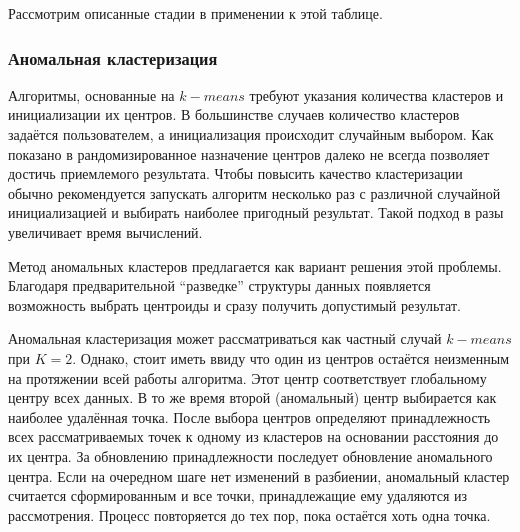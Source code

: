 \documentclass[12pt,twoside,a4paper,tikz,border=5]{refart}
\begin{document}
			Рассмотрим описанные стадии в применении к этой таблице.

			\subsubsection{Аномальная кластеризация}
		 		Алгоритмы, основанные на $ k-means $ требуют указания количества кластеров и инициализации их центров. В большинстве случаев количество кластеров задаётся пользователем, а инициализация происходит случайным выбором. Как показано в \cite{mirkin-ds} рандомизированное назначение центров далеко не всегда позволяет достичь приемлемого результата. Чтобы повысить качество кластеризации обычно рекомендуется запускать алгоритм несколько раз с различной случайной инициализацией и выбирать наиболее пригодный результат. Такой подход в разы увеличивает время вычислений. 
		 		
		 		Метод аномальных кластеров предлагается как вариант решения этой проблемы. Благодаря предварительной ``разведке'' структуры данных появляется возможность выбрать центроиды и сразу получить допустимый результат. 
		 		
		 		Аномальная кластеризация может рассматриваться как  частный случай $ k-means $ при $ K=2 $. Однако, стоит иметь ввиду что один из центров остаётся неизменным на протяжении всей работы алгоритма. Этот центр соответствует глобальному центру всех данных. В то же время второй (аномальный) центр выбирается как наиболее удалённая точка. После выбора центров определяют принадлежность всех рассматриваемых точек к одному из кластеров на основании расстояния до их центра. За обновлению принадлежности последует обновление аномального центра. Если на очередном шаге нет изменений в разбиении, аномальный кластер считается сформированным и все точки, принадлежащие ему удаляются из рассмотрения. Процесс повторяется до тех пор, пока остаётся хоть одна точка. 
				
\end{document}
